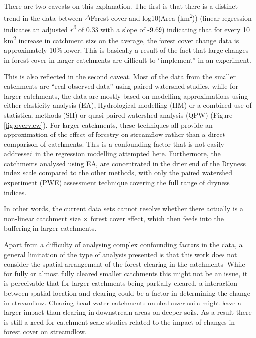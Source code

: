 \documentclass[]{elsarticle} %
\begin{document}
There are two caveats on this explanation. The first is that there is a distinct trend in the data between \(\Delta\)Forest cover and log10(Area (km\textsuperscript{2})) (linear regression indicates an adjusted \emph{r\textsuperscript{2}} of 0.33 with a slope of -9.69) indicating that for every 10 km\textsuperscript{2} increase in catchment size on the average, the forest cover change data is approximately 10\% lower. This is basically a result of the fact that large changes in forest cover in larger catchments are difficult to ``implement'' in an experiment.

This is also reflected in the second caveat. Most of the data from the smaller catchments are ``real observed data'' using paired watershed studies, while for larger catchments, the data are mostly based on modelling approximations using either elasticity analysis (EA), Hydrological modelling (HM) or a combined use of statistical methods (SH) or quasi paired watershed analysis (QPW) (Figure \ref{fig:overview}). For larger catchments, these techniques all provide an approximation of the effect of forestry on streamflow rather than a direct comparison of catchments. This is a confounding factor that is not easily addressed in the regression modelling attempted here. Furthermore, the catchments analysed using EA, are concentrated in the drier end of the Dryness index scale compared to the other methods, with only the paired watershed experiment (PWE) assessment technique covering the full range of dryness indices.

In other words, the current data sets cannot resolve whether there actually is a non-linear catchment size × forest cover effect, which then feeds into the buffering in larger catchments.

Apart from a difficulty of analysing complex confounding factors in the data, a general limitation of the type of analysis presented is that this work does not consider the spatial arrangement of the forest clearing in the catchments. While for fully or almost fully cleared smaller catchments this might not be an issue, it is perceivable that for larger catchments being partially cleared, a interaction between spatial location and clearing could be a factor in determining the change in streamflow. Clearing head water catchments on shallower soils might have a larger impact than clearing in downstream areas on deeper soils. As a result there is still a need for catchment scale studies related to the impact of changes in forest cover on streamdlow.
\end{document}
